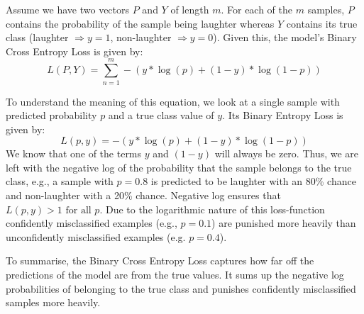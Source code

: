 \documentclass[bsc,frontabs,parskip,deptreport]{infthesis}
\begin{document}
Assume we have two vectors $P$ and $Y$ of length $m$. For each of the $m$ samples, $P$ contains the probability of the sample being laughter whereas $Y$ contains its true class (laughter $\Rightarrow y=1$, non-laughter $ \Rightarrow y=0$).
Given this, the model's Binary Cross Entropy Loss is given by:
$$ L(P,Y) = \sum_{n=1}^{m}  -{(y*\log(p) + (1 - y)*\log(1 - p))}$$

To understand the meaning of this equation, we look at a single sample with predicted probability $p$ and a true class value of $y$. Its Binary Entropy Loss is given by: 
$$ L(p,y) = -{(y*\log(p) + (1 - y)*\log(1 - p))} $$
We know that one of the terms $y$ and $(1-y)$ will always be zero.
Thus, we are left with the negative log of the probability that the sample belongs to the true class, e.g., a sample with $p=0.8$ is predicted to be laughter with an 80\% chance and non-laughter with a 20\% chance. Negative log ensures that $L(p,y) > 1  \textrm{ for all } p $. 
Due to the logarithmic nature of this loss-function confidently misclassified examples (e.g., $p=0.1$) are punished more heavily than unconfidently misclassified examples (e.g. $p=0.4$).

To summarise, the Binary Cross Entropy Loss captures how far off the predictions of the model are from the true values. It sums up the negative log probabilities of belonging to the true class and punishes confidently misclassified samples more heavily.

%
\end{document}
